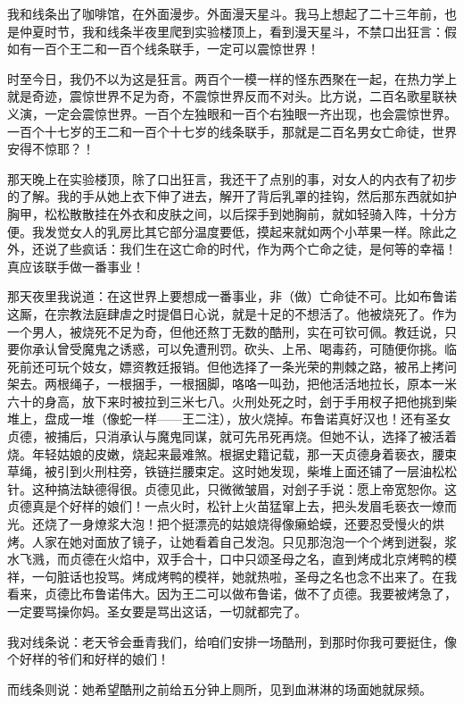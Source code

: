 我和线条出了咖啡馆，在外面漫步。外面漫天星斗。我马上想起了二十三年前，也是仲夏时节，我和线条半夜里爬到实验楼顶上，看到漫天星斗，不禁口出狂言：假如有一百个王二和一百个线条联手，一定可以震惊世界！ 

时至今日，我仍不以为这是狂言。两百个一模一样的怪东西聚在一起，在热力学上就是奇迹，震惊世界不足为奇，不震惊世界反而不对头。比方说，二百名歌星联袂义演，一定会震惊世界。一百个左独眼和一百个右独眼一齐出现，也会震惊世界。一百个十七岁的王二和一百个十七岁的线条联手，那就是二百名男女亡命徒，世界安得不惊耶？！ 

那天晚上在实验楼顶，除了口出狂言，我还干了点别的事，对女人的内衣有了初步的了解。我的手从她上衣下伸了进去，解开了背后乳罩的挂钩，然后那东西就如护胸甲，松松散散挂在外衣和皮肤之间，以后探手到她胸前，就如轻骑入阵，十分方便。我发觉女人的乳房比其它部分温度要低，摸起来就如两个小苹果一样。除此之外，还说了些疯话：我们生在这亡命的时代，作为两个亡命之徒，是何等的幸福！真应该联手做一番事业！ 

那天夜里我说道：在这世界上要想成一番事业，非（做）亡命徒不可。比如布鲁诺这厮，在宗教法庭肆虐之时提倡日心说，就是十足的不想活了。他被烧死了。作为一个男人，被烧死不足为奇，但他还熬丁无数的酷刑，实在可钦可佩。教廷说，只要你承认曾受魔鬼之诱惑，可以免遭刑罚。砍头、上吊、喝毒药，可随便你挑。临死前还可玩个妓女，嫖资教廷报销。但他选择了一条光荣的荆棘之路，被吊上拷问架去。两根绳子，一根捆手，一根捆脚，咯咯一叫劲，把他活活地拉长，原本一米六十的身高，放下来时被拉到三米七八。火刑处死之时，刽于手用杈子把他挑到柴堆上，盘成一堆（像蛇一样——王二注），放火烧掉。布鲁诺真好汉也！还有圣女贞德，被捕后，只消承认与魔鬼同谋，就可先吊死再烧。但她不认，选择了被活着烧。年轻姑娘的皮嫩，烧起来最难煞。根据史籍记载，那一天贞德身着亵衣，腰束草绳，被引到火刑柱旁，铁链拦腰束定。这时她发现，柴堆上面还铺了一层油松松针。这种搞法缺德得很。贞德见此，只微微皱眉，对刽子手说：愿上帝宽恕你。这贞德真是个好样的娘们！一点火时，松针上火苗猛窜上去，把头发眉毛亵衣一燎而光。还烧了一身燎浆大泡！把个挺漂亮的姑娘烧得像癞蛤蟆，还要忍受慢火的烘烤。人家在她对面放了镜子，让她看着自己发泡。只见那泡泡一个个烤到迸裂，浆水飞溅，而贞德在火焰中，双手合十，口中只颂圣母之名，直到烤成北京烤鸭的模祥，一句脏话也投骂。烤成烤鸭的模祥，她就热啦，圣母之名也念不出来了。在我看来，贞德比布鲁诺伟大。因为王二可以做布鲁诺，做不了贞德。我要被烤急了，一定要骂操你妈。圣女要是骂出这话，一切就都完了。 

我对线条说：老天爷会垂青我们，给咱们安排一场酷刑，到那时你我可要挺住，像个好样的爷们和好样的娘们！ 

而线条则说：她希望酷刑之前给五分钟上厕所，见到血淋淋的场面她就尿频。 

